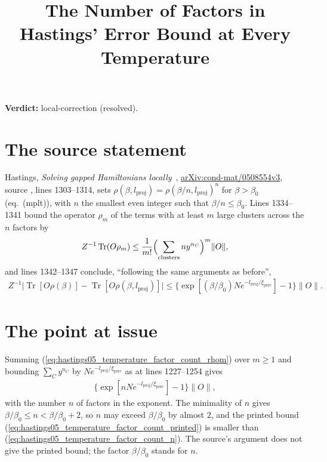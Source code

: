 \documentclass{article}
\title{The Number of Factors in Hastings' Error Bound at Every Temperature}
\author{}
\date{}
\providecommand{\gapnote}[2]{\par\noindent\textbf{Verdict:} #1 (#2).\par}
\begin{document}
\maketitle
\gapnote{local-correction}{resolved}

\section{The source statement}
Hastings, \emph{Solving gapped Hamiltonians locally}~\cite{Hastings2006Solving},
\href{https://arxiv.org/abs/cond-mat/0508554v3}{arXiv:cond-mat/0508554v3},
source , lines 1303--1314, sets
$\rho(\beta,l_{\mathrm{proj}})=\rho(\beta/n,l_{\mathrm{proj}})^n$ for
$\beta>\beta_0$ (eq.~(mplt)), with $n$ the smallest even integer such that
$\beta/n\le\beta_0$. Lines 1334--1341 bound the operator $\rho_m$ of the terms
with at least $m$ large clusters across the $n$ factors by
\begin{align}
  Z^{-1}\operatorname{Tr}(O\rho_m)\le\frac1{m!}
  \Bigl(\sum_{\mathrm{clusters}}ny^{n_C}\Bigr)^m\lVert O\rVert,
  \label{eq:hastings05_temperature_factor_count_rhom}
\end{align}
and lines 1342--1347 conclude, ``following the same arguments as before'',
\begin{align}
  Z^{-1}\bigl|\operatorname{Tr}[O\rho(\beta)]
  -\operatorname{Tr}[O\rho(\beta,l_{\mathrm{proj}})]\bigr|
  \le\bigl\{\exp[(\beta/\beta_0)Ne^{-l_{\mathrm{proj}}/\xi_{\mathrm{perc}}}]
  -1\bigr\}\lVert O\rVert.
  \label{eq:hastings05_temperature_factor_count_printed}
\end{align}

\section{The point at issue}
Summing (\ref{eq:hastings05_temperature_factor_count_rhom}) over $m\ge1$ and
bounding $\sum_Cy^{n_C}$ by $Ne^{-l_{\mathrm{proj}}/\xi_{\mathrm{perc}}}$ as
at lines 1227--1254 gives
\begin{align}
  \bigl\{\exp[nNe^{-l_{\mathrm{proj}}/\xi_{\mathrm{perc}}}]-1\bigr\}
  \lVert O\rVert,
  \label{eq:hastings05_temperature_factor_count_n}
\end{align}
with the number $n$ of factors in the exponent. The minimality of $n$ gives
$\beta/\beta_0\le n<\beta/\beta_0+2$, so $n$ may exceed $\beta/\beta_0$ by
almost $2$, and the printed bound
(\ref{eq:hastings05_temperature_factor_count_printed}) is smaller than
(\ref{eq:hastings05_temperature_factor_count_n}). The source's argument does
not give the printed bound; the factor $\beta/\beta_0$ stands for $n$.
\end{document}
